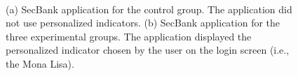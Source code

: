 \begin{figure}[!ht]
  \centering
  ~
  \quad
  \caption[SecBank application for the control group and the three experimental groups]{
  (a) SecBank application for the control group. The application did not use personalized indicators.
  (b) SecBank application for the three experimental groups. 
  The application displayed the personalized indicator chosen by the user on the login screen (i.e., the Mona Lisa).}
\end{figure}

